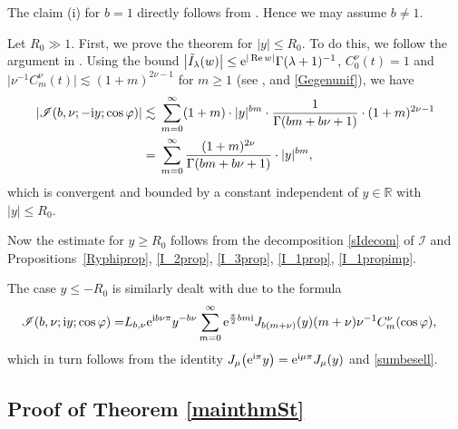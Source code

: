 \documentclass[pdftex]{sigma}
\numberwithin{equation}{section}
\def\R{\mathbb{R}}%
\DeclareMathOperator{\re}{Re}%
\def\f{\varphi}
\def\l{\lambda}
\def\m{\mu}
\def\n{\nu}
\newcommand{\sI}{\mathscr{I}}
\begin{document}
The claim (i) for $b=1$ directly follows from \cite[equation~(4.45)]{BKO}. Hence we may assume $b\neq 1$.





Let $R_0\gg 1$. First, we prove the theorem for $|y|\leq R_0$. To do this, we follow the argument in \cite[Lemma 4.17]{BKO}.
Using the bound $\big|\tilde{I}_{\l}(w)\big|\leq {\rm e}^{|\re w|}\Gamma(\l+1)^{-1}$, $C_0^{\n}(t)=1$ and $\big|\n^{-1}C_{m}^{\n}(t)\big|\lesssim (1+m)^{2\n-1}$ for $m\geq 1$ (see \cite[equation~(4.16)]{BKO}, \cite[Fact 4.8]{BKO} and \eqref{Gegenunif}), we have
\begin{align*}
|\sI(b,\nu;-{\rm i}y;\cos\f)|\lesssim{}& \sum_{m=0}^{\infty}(1+m)\cdot |y|^{bm}\cdot \frac{1}{\Gamma(bm+b\n+1)}\cdot (1+m)^{2\n-1}\\
={}&\sum_{m=0}^{\infty}\frac{(1+m)^{2\n}}{\Gamma(bm+b\n+1)}\cdot |y|^{bm},
\end{align*}
which is convergent and bounded by a constant independent of $y\in \R$ with $|y|\leq R_0$.




Now the estimate for $y\geq R_0$ follows from the decomposition \eqref{sIdecom} of $\sI$ and Propositions~\ref{Ryphiprop}, \ref{I_2prop}, \ref{I_3prop}, \ref{I_1prop}, \ref{I_1propimp}.


The case $y\leq -R_0$ is similarly dealt with due to the formula
\begin{align*}
\sI(b,\nu;{\rm i}y;\cos\f)=&L_{b,\n}{\rm e}^{{\rm i}b\n\pi}y^{-b\n}\sum_{m=0}^{\infty}{\rm e}^{\frac{\pi}{2}bm{\rm i}}J_{b(m+\n)}(y)(m+\nu)\n^{-1}C^{\nu}_m(\cos\f),
\end{align*}
which in turn follows from the identity $J_{\m}\bigl({\rm e}^{{\rm i}\pi}y\bigr)={\rm e}^{{\rm i}\m\pi}J_{\m}(y)$ and \eqref{sumbesell}.





















\subsection[Proof of Theorem 1.1]{Proof of Theorem \ref{mainthmSt}}\label{subsec:Stpf}
\end{document}
